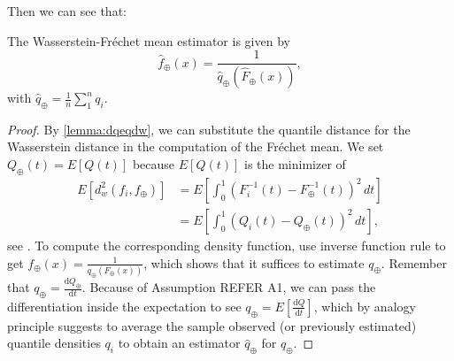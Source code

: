 Then we can see that:
\begin{lemma}
    The Wasserstein-Fréchet mean estimator is given by
    \begin{equation}
        \hat{f}_\oplus(x) = \frac{1}{\hat{q}_\oplus(\hat{F}_\oplus(x))},
    \end{equation}
    with $\hat{q}_\oplus = \frac{1}{n} \sum_{1}^{n} q_i$.
\end{lemma}
\begin{proof}
    By \ref{lemma:dqeqdw}, we can substitute the quantile distance for the
    Wasserstein distance in the computation of the Fréchet mean. We set
    $Q_\oplus(t) = E[Q(t)]$ because $E[Q(t)]$ is the minimizer of
    \begin{equation}
    \label{eq:wf_mean}
        \begin{aligned}
            E[d_w^2(f_i, f_\oplus)]	& =
            E\left[\int_{0}^{1}(F_i^{-1}(t) - F_\oplus^{-1}(t))^2 \,dt\right] \\
                                    & =
            E\left[\int_{0}^{1}(Q_i(t) - Q_\oplus(t))^2 \,dt\right],
        \end{aligned}
    \end{equation}
    see \citet[Chapter~3.1.4]{PanaretosZemel2020}. To compute the corresponding density
    function, use inverse function rule to get
    $f_\oplus(x) = \frac{1}{q_\oplus(F_\oplus(x))}$, which shows that it suffices to
    estimate $q_\oplus$. Remember that
    $q_\oplus = \frac{\mathrm{d}Q_\oplus}{\mathrm{d}t}$. Because of Assumption REFER A1,
    we can pass the differentiation inside the expectation to see
    $q_\oplus = E\left[\frac{\mathrm{d}Q}{\mathrm{d}t}\right]$, which by analogy
    principle suggests to average the sample observed (or previously estimated)
    quantile densities $q_i$ to obtain an estimator $\hat{q}_\oplus$ for $q_\oplus$.
\end{proof}
